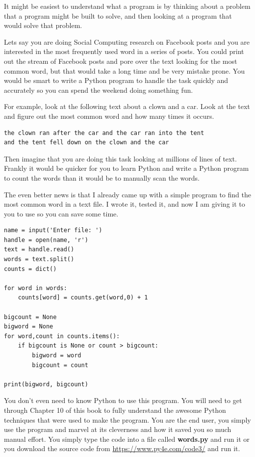 It might be easiest to understand what a program is by thinking about a problem 
that a program might be built to solve, and then looking at a program
that would solve that problem.

Lets say you are doing Social Computing research on Facebook posts and 
you are interested in the most frequently used word in a series of posts.
You could print out the stream of Facebook posts and pore over the text
looking for the most common word, but that would take a long time and be very 
mistake prone.  You would be smart to write a Python program to handle the
task quickly and accurately so you can spend the weekend doing something 
fun.

For example, look at the following text about a clown and a car.  Look at the 
text and figure out the most common word and how many times it occurs.

\beforeverb
\begin{verbatim}
the clown ran after the car and the car ran into the tent 
and the tent fell down on the clown and the car 
\end{verbatim}
\afterverb
%
Then imagine that you are doing this task looking at millions of lines of 
text.  Frankly it would be quicker for you to learn Python and write a 
Python program to count the words than it would be to manually 
scan the words.

The even better news is that I already came up with a simple program to 
find the most common word in a text file.  I wrote it,
tested it, and now I am giving it to you to use so you can save some time.

\beforeverb
\begin{verbatim}
name = input('Enter file: ')
handle = open(name, 'r')
text = handle.read()
words = text.split()
counts = dict()

for word in words:
    counts[word] = counts.get(word,0) + 1

bigcount = None
bigword = None
for word,count in counts.items():
    if bigcount is None or count > bigcount:
        bigword = word
        bigcount = count

print(bigword, bigcount)

\end{verbatim}
\afterverb
%
You don't even need to know Python to use this program.  You will need to get through 
Chapter 10 of this book to fully understand the awesome Python techniques that were
used to make the program.  You are the end user, you simply use the program and marvel
at its cleverness and how it saved you so much manual effort.
You simply type the code 
into a file called {\bf words.py} and run it or you download the source 
code from \url{https://www.py4e.com/code3/} and run it.


